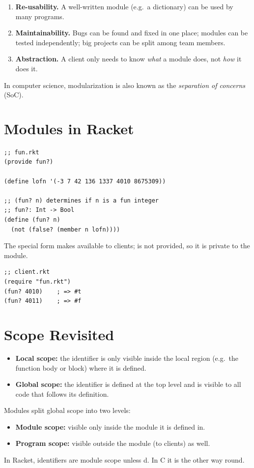 \begin{enumerate}
  \item \textbf{Re-usability.} A well-written module (e.g.\ a dictionary) can be used by many
    programs.
  \item \textbf{Maintainability.} Bugs can be found and fixed in one place; modules can be
    tested independently; big projects can be split among team members.
  \item \textbf{Abstraction.} A client only needs to know \emph{what} a module does, not
    \emph{how} it does it.
\end{enumerate}

In computer science, modularization is also known as the \emph{separation of concerns} (SoC).

\section{Modules in Racket}

\begin{lstlisting}[style=racket]
;; fun.rkt
(provide fun?)

(define lofn '(-3 7 42 136 1337 4010 8675309))

;; (fun? n) determines if n is a fun integer
;; fun?: Int -> Bool
(define (fun? n)
  (not (false? (member n lofn))))
\end{lstlisting}
The  special form makes  available to clients;  is not
provided, so it is private to the module.
\begin{lstlisting}[style=racket]
;; client.rkt
(require "fun.rkt")
(fun? 4010)    ; => #t
(fun? 4011)    ; => #f
\end{lstlisting}

\section{Scope Revisited}

\begin{itemize}
  \item \textbf{Local scope:} the identifier is only visible inside the local region (e.g.\ the
    function body or block) where it is defined.
  \item \textbf{Global scope:} the identifier is defined at the top level and is visible to all
    code that follows its definition.
\end{itemize}
Modules split global scope into two levels:
\begin{itemize}
  \item \textbf{Module scope:} visible only inside the module it is defined in.
  \item \textbf{Program scope:} visible outside the module (to clients) as well.
\end{itemize}
In Racket, identifiers are module scope unless d. In C it is the other way round.

